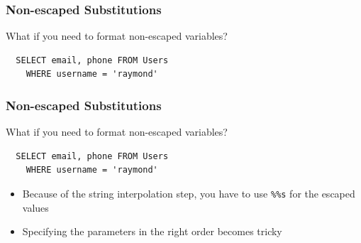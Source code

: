 \documentclass{beamer}
\begin{document}
\begin{frame}[fragile]
  \frametitle{Non-escaped Substitutions}

  What if you need to format non-escaped variables?

\begin{verbatim}
  SELECT email, phone FROM Users 
    WHERE username = 'raymond'
\end{verbatim}



\vspace{1.5cm}

\end{frame}


\begin{frame}[fragile]
  \frametitle{Non-escaped Substitutions}

  What if you need to format non-escaped variables?

\begin{verbatim}
  SELECT email, phone FROM Users 
    WHERE username = 'raymond'
\end{verbatim}


\begin{itemize}
\item Because of the string interpolation step, you have to use \verb=%%s= for
  the escaped values
\item Specifying the parameters in the right order becomes tricky
\end{itemize}

\end{frame}
\end{document}

